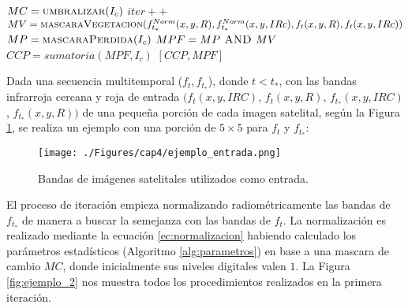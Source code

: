 \begin{algorithm}
\begin{algorithmic}[1]
								
			\State {}
			\State $MC=\textsc{umbralizar}(I_{c})$	
			\Statex
			\State $iter++$
		\EndWhile	
		\Statex
		\State {}
		\State $MV=\textsc{mascaraVegetacion}(f_{t_{*}}^{Norm}(x,y,R),f_{t_{*}}^{Norm}(x,y,IRc),f_{t}(x,y,R),f_{t}(x,y,IRc))$
		\State 
		\State {}
		\State $MP=\textsc{mascaraPerdida}(I_{c})$
		\Statex		
		\State {}
		\State $MPF=MP \textsc{ AND } MV $ 
		\Statex 		
		\State {}
		\State $CCP=sumatoria(MPF,I_{c})$
		\Statex 
		\Return $[CCP,MPF]$
		\Statex 
		
	\end{algorithmic}
\end{algorithm}

Dada una secuencia multitemporal ($ f_{t},f_{t_{*}} $), donde $ t<t_{*} $, con las bandas infrarroja cercana y roja de entrada $ (f_{t}(x,y,IRC)$, $f_{t}(x,y,R)$, $f_{t_{*}}(x,y,IRC)$,  $f_{t_{*}}(x,y,R)) $ de una peque\~{n}a porci\'on de cada imagen satelital, seg\'un la Figura \ref{fig:ejemplo_1}, se realiza un ejemplo con una porci\'on de $ 5 \times 5 $ para $ f_{t} $ y $ f_{t_{*}} $:
\begin{figure}[H]
	\centering
	\texttt{[image: ./Figures/cap4/ejemplo\_entrada.png]}
	\caption{Bandas de im\'agenes satelitales utilizados como entrada.}
	\label{fig:ejemplo_1}
\end{figure}
El proceso de iteraci\'on empieza normalizando radiom\'etricamente las bandas de $ f_{t_{*}} $ de manera a buscar la semejanza con las bandas de $ f_{t} $. La normalizaci\'on es realizado mediante la ecuaci\'on \ref{ec:normalizacion} habiendo calculado los par\'ametros estad\'isticos (Algoritmo \ref{alg:parametros}) en base a una mascara de cambio $ MC $, donde inicialmente sus niveles digitales valen $ 1 $. La Figura \ref{fig:ejemplo_2} nos muestra todos los procedimientos realizados en la primera iteraci\'on. 

